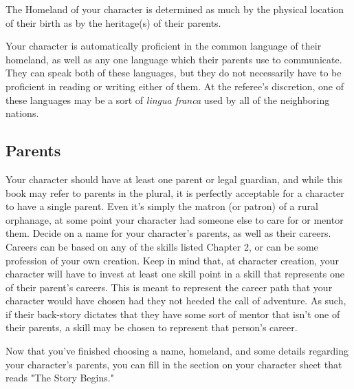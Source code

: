 \documentclass[oneside]{book}
\begin{document}
\begin{multicols}{2}
The Homeland of your character is determined as much by the physical location of their birth as by the heritage(s) of their parents. 

Your character is automatically proficient in the common language of their homeland, as well as any one language which their parents use to communicate. They can speak both of these languages, but they do not necessarily have to be proficient in reading or writing either of them. At the referee's discretion, one of these languages may be a sort of \emph{lingua franca} used by all of the neighboring nations. 

\subsection{Parents}
Your character should have at least one parent or legal guardian, and while this book may refer to parents in the plural, it is perfectly acceptable for a character to have a single parent. Even it's simply the matron (or patron) of a rural orphanage, at some point your character had someone else to care for or mentor them. Decide on a name for your character's parents, as well as their careers. Careers can be based on any of the skills listed Chapter 2, or can be some profession of your own creation. Keep in mind that, at character creation, your character will have to invest at least one skill point in a skill that represents one of their parent's careers. This is meant to represent the career path that your character would have chosen had they not heeded the call of adventure. As such, if their back-story dictates that they have some sort of mentor that isn't one of their parents, a skill may be chosen to represent that person's career.

Now that you've finished choosing a name, homeland, and some details regarding your character's parents, you can fill in the section on your character sheet that reads "The Story Begins."


\end{multicols}
\end{document}

